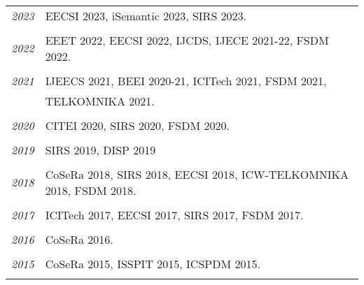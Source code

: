 \documentclass[paper=a4,fontsize=11pt]{scrartcl}
\begin{document}

~\\
\begin{tabular}{r|p{12cm}}
	\emph{2023} & EECSI 2023, iSemantic 2023, SIRS 2023. \\
	\multicolumn{2}{c}{} \\
	
	\emph{2022} & EEET 2022, EECSI 2022, IJCDS, IJECE 2021-22, FSDM 2022. \\
	\multicolumn{2}{c}{} \\
	
	\emph{2021} & IJEECS 2021, BEEI 2020-21, ICITech 2021, FSDM 2021, \\
		& TELKOMNIKA 2021. \\
	\multicolumn{2}{c}{} \\
	
	\emph{2020} & CITEI 2020, SIRS 2020, FSDM 2020. \\
	\multicolumn{2}{c}{} \\
	
	\emph{2019} & SIRS 2019, DISP 2019 \\
	\multicolumn{2}{c}{} \\
	
	\emph{2018} & CoSeRa 2018, SIRS 2018, EECSI 2018, ICW-TELKOMNIKA 2018, FSDM 2018.\\
	\multicolumn{2}{c}{} \\
	
	\emph{2017} & ICITech 2017, EECSI 2017, SIRS 2017, FSDM 2017.\\
	\multicolumn{2}{c}{} \\
	
	\emph{2016} & CoSeRa 2016.\\
	\multicolumn{2}{c}{} \\
	
	\emph{2015} & CoSeRa 2015, ISSPIT 2015, ICSPDM 2015.\\
	\multicolumn{2}{c}{}
\end{tabular}
\end{document}
